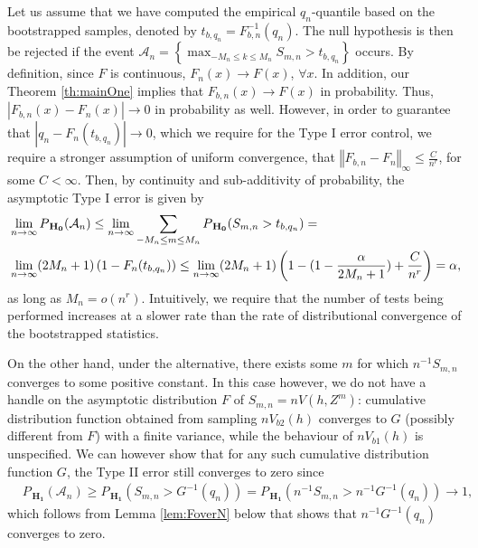 Let us assume that we have computed the empirical $q_{n}$-quantile based on the bootstrapped samples, denoted by $t_{b,q_{n}}=F_{b,n}^{-1}(q_n)$. The null hypothesis is then be rejected if the event $\mathcal A_{n} = \left\{ \max_{-M_n \leq k \leq M_n} S_{m,n} > t_{b,q_{n}} \right\}$ occurs. By definition, since $F$ is continuous, $F_n(x)\to F(x)$, $\forall x$. In addition, our Theorem \ref{th:mainOne} implies that $F_{b,n}(x)\to F(x)$ in probability. Thus, $|F_{b,n}(x)-F_n(x)|\to 0$ in probability as well. However, in order to guarantee that $|q_n-F_n(t_{b,q_{n}})|\to 0$, which we require for the Type I error control, we require a stronger assumption of uniform convergence, that $\left\Vert F_{b,n}-F_n\right\Vert_{\infty}\leq \frac{C}{n^r}$, for some $C<\infty$. Then, by continuity and sub-additivity of probability, the asymptotic Type I error is given by 
\begin{align}
\label{eq:type1}
&\lim_{n \to \infty} P_{\,\mathbf{H_0}}( \mathcal A_{n}) \leq \lim_{n \to \infty}  \sum_{-M_n \leq m \leq M_n} P_{\,\mathbf{H_0}}(S_{m,n} >t_{b,q_{n}}) = \notag\\  
&\lim_{n \to \infty} (2M_n+1) \left(1-F_n(t_{b,q_{n}})\right) \leq \lim_{n \to \infty} (2M_n+1) \left( 1 - (1-\frac{\alpha}{2M_n+1}) + \frac C {n^r}\right)= \alpha, 
\end{align}
as long as $M_n=o(n^r)$. Intuitively, we require that the number of tests being performed increases at a slower rate than the rate of distributional convergence of the bootstrapped statistics.%
 
On the other hand, under the alternative, there exists some $m$ for which $n^{-1} S_{m,n}$ converges to some positive constant. In this case however, we do not have a handle on the asymptotic distribution $F$ of $S_{m,n} = n V(h,Z^m)$: cumulative distribution function obtained from sampling $n V_{b2}(h)$ converges to $G$ (possibly different from $F$) with a finite variance, while the behaviour of $n V_{b1}(h)$ is unspecified. We can however show that for any such cumulative distribution function $G$, the Type II error still converges to zero since
\begin{align*}
&P_{\,\mathbf{H_1}}(\mathcal A_{n}) \geq P_{\,\mathbf{H_1}}( S_{m,n} > G^{-1}(q_{n}) ) = P_{\,\mathbf{H_1}}( n^{-1} S_{m,n} > n^{-1} G^{-1}(q_{n}) ) \to 1,
\end{align*}
which follows from Lemma  \ref{lem:FoverN} below that shows that $n^{-1} G^{-1}(q_{n})$ converges to zero. 

